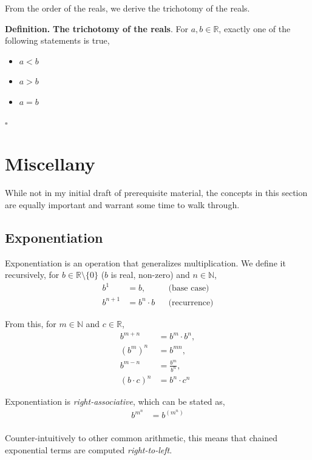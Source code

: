 \documentclass[letterpaper,twoside]{article}
\def\SmallHSpace{\hspace*{1mm}}
\newcommand{\DefinedTerm}[1]{\textbf{#1}}
\newcommand{\Definition}[1]{%
    \emoji{book} \textbf{Definition.}\SmallHSpace #1 \hfill $\square$
}
\newenvironment{SorrellItemize}
{
    \setlength\parskip{-5pt}
    \begin{itemize}[leftmargin=11pt]
        \setlength\itemsep{-4pt}
}{
    \end{itemize}
}
\begin{document}
\begin{multicols*}{2}
    From the order of the reals, we derive the trichotomy of the reals.

    \Definition
    {
        \DefinedTerm{The trichotomy of the reals}.
        For $a,b\in\mathbb{R}$, exactly one of the following statements is true,
        \begin{SorrellItemize}
            \item $a<b$
            \item $a>b$
            \item $a=b$
        \end{SorrellItemize}
    }

\section{Miscellany}

While not in my initial draft of prerequisite material, the concepts in this section are equally important and warrant some time to walk through.

\subsection{Exponentiation}

Exponentiation is an operation that generalizes multiplication.
We define it recursively, for $b\in\mathbb{R}\setminus\{0\}$ ($b$ is real, non-zero) and $n\in\mathbb{N}$,
\begin{align*}
    b^1&=b, &&\text{(base case)}\\
    b^{n+1}&=b^n \cdot b &&\text{(recurrence)}
\end{align*}

From this, for $m\in\mathbb{N}$ and $c\in\mathbb{R}$,
\begin{align*}
    b^{m+n}&=b^m\cdot b^n,\\
    \left(b^{m}\right)^n &=b^{mn},\\
    b^{m-n}&=\frac{b^m}{b^n},\\
    \left(b\cdot c\right)^n&=b^n \cdot c^n
\end{align*}

Exponentiation is \textit{right-associative}, which can be stated as,
\begin{align*}
    b^{m^n}&=b^{(m^n)}\\
\end{align*}

Counter-intuitively to other common arithmetic, this means that chained exponential terms are computed \textit{right-to-left}.


\end{multicols*}
\end{document}
